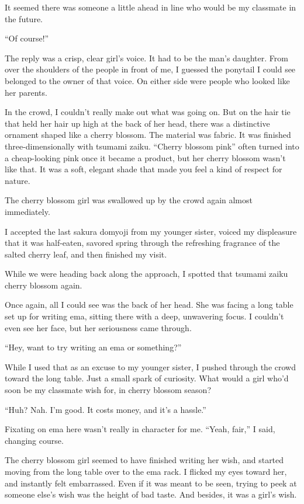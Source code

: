 \documentclass[
    a4paper,
    12pt,
    twoside,
    openany,
    UTF8,
    fontset=windows
]{ctexbook}
\begin{document}
It seemed there was someone a little ahead in line who would be my classmate in the future.

``Of course!''

The reply was a crisp, clear girl's voice. It had to be the man's daughter. From over the shoulders of the people in front of me, I guessed the ponytail I could see belonged to the owner of that voice. On either side were people who looked like her parents.

In the crowd, I couldn't really make out what was going on. But on the hair tie that held her hair up high at the back of her head, there was a distinctive ornament shaped like a cherry blossom. The material was fabric. It was finished three-dimensionally with tsumami zaiku. ``Cherry blossom pink'' often turned into a cheap-looking pink once it became a product, but her cherry blossom wasn't like that. It was a soft, elegant shade that made you feel a kind of respect for nature.

The cherry blossom girl was swallowed up by the crowd again almost immediately.

I accepted the last sakura domyoji from my younger sister, voiced my displeasure that it was half-eaten, savored spring through the refreshing fragrance of the salted cherry leaf, and then finished my visit.

While we were heading back along the approach, I spotted that tsumami zaiku cherry blossom again.

Once again, all I could see was the back of her head. She was facing a long table set up for writing ema, sitting there with a deep, unwavering focus. I couldn't even see her face, but her seriousness came through.

``Hey, want to try writing an ema or something?''

While I used that as an excuse to my younger sister, I pushed through the crowd toward the long table. Just a small spark of curiosity. What would a girl who'd soon be my classmate wish for, in cherry blossom season?

``Huh? Nah. I'm good. It costs money, and it's a hassle.''

Fixating on ema here wasn't really in character for me. ``Yeah, fair,'' I said, changing course.

The cherry blossom girl seemed to have finished writing her wish, and started moving from the long table over to the ema rack. I flicked my eyes toward her, and instantly felt embarrassed. Even if it was meant to be seen, trying to peek at someone else's wish was the height of bad taste. And besides, it was a girl's wish.
\end{document}
